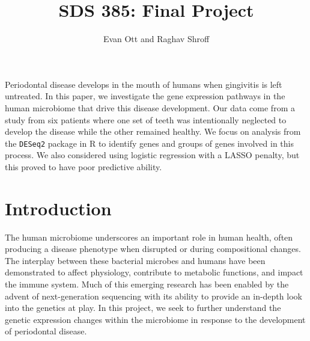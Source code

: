 \documentclass{article}
\title{\vspace{-6ex}SDS 385: Final Project\vspace{-2ex}}
\author{Evan Ott and Raghav Shroff\vspace{-2ex}}
\renewenvironment{abstract}
 {\small
  \begin{center}
  \bfseries \abstractname\vspace{-.5em}\vspace{0pt}
  \end{center}
  \list{}{%
    \setlength{\leftmargin}{1.25in}%
    \setlength{\rightmargin}{\leftmargin}%
  }%
  \item\relax}
 {\endlist}
\begin{document}
\maketitle

\begin{abstract}
Periodontal disease develops in the mouth of humans when gingivitis is left untreated. In this paper, we
investigate the gene expression pathways in the human microbiome that drive this disease development. Our
data come from a study from six patients where one set of teeth was intentionally neglected to develop the disease
while the other remained healthy.
We focus on analysis from the \texttt{DESeq2} package in R to identify genes and groups of genes involved
in this process. We also considered using logistic regression with a LASSO penalty, but this proved to have
poor predictive ability.
\end{abstract}

\tableofcontents


\section{Introduction}

The human microbiome underscores an important role in human health, often producing a disease phenotype when disrupted or during compositional changes. The interplay between these bacterial microbes and humans have been demonstrated to affect physiology, contribute to metabolic functions, and impact the immune system. Much of this emerging research has been enabled by the advent of next-generation sequencing with its ability to provide an in-depth look into the genetics at play. In this project, we seek to further understand the genetic expression changes within the microbiome in response to the development of periodontal disease. 
\end{document}
